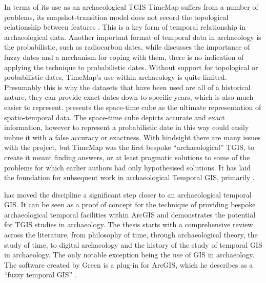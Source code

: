 In terms of its use as an archaeological TGIS TimeMap suffers from a number of problems, its snapshot-transition model does not record the topological relationship between features \citep{Johnson:1999cr}. This is a key form of temporal relationship in archaeological data. Another important format of temporal data in archaeology is the probabilistic, such as radiocarbon dates, while \citet{Johnson:1999cr} discusses the importance of fuzzy dates and a mechanism for coping with them, there is no indication of applying the technique to probabilistic dates. Without support for topological or probabilistic dates, TimeMap's use within archaeology is quite limited. Presumably this is why the datasets that have been used are all of a historical nature, they can provide exact dates down to specific years, which is also much easier to represent. \citet{Johnson:2002kx} presents the space-time cube as the ultimate representation of spatio-temporal data. The space-time cube depicts accurate and exact information, however to represent a probabilistic date in this way could easily imbue it with a false accuracy or exactness. With hindsight there are many issues with the project, but TimeMap was the first bespoke ``archaeological'' TGIS, to create it meant finding answers, or at least pragmatic solutions to some of the problems for which earlier authors had only hypothesised solutions. It has laid the foundation for subsequent work in archaeological Temporal GIS, primarily \citet{Green:2008fk}. 

\citet{Green:2008fk} has moved the discipline a significant step closer to an archaeological temporal GIS. It can be seen as a proof of concept for the technique of providing bespoke archaeological temporal facilities within ArcGIS and demonstrates the potential for TGIS studies in archaeology. The thesis starts with a comprehensive review across the literature, from philosophy of time, through archaeological theory, the study of time, to digital archaeology and the history of the study of temporal GIS in archaeology. The only notable exception being the use of GIS in archaeology. The software created by Green is a plug-in for ArcGIS, which he describes as a ``fuzzy temporal GIS'' \citep[242]{Green:2008fk}. 

